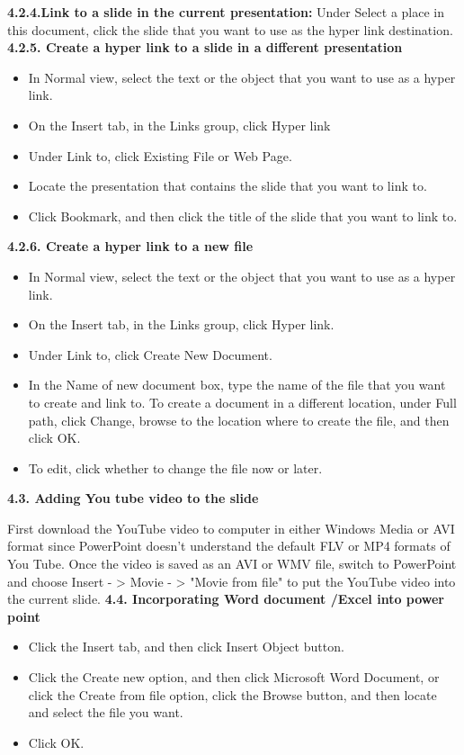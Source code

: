 \textbf{4.2.4.Link to a slide in the current presentation:}
Under Select a place in this document, click the slide that you want to use as the hyper link destination.
\textbf{4.2.5. Create a hyper link to a slide in a different presentation}
\begin{itemize}
  \item In Normal view, select the text or the object that you want to use as a hyper link.
  \item On the Insert tab, in the Links group, click Hyper link
  \item Under Link to, click Existing File or Web Page.
  \item  Locate the presentation that contains the slide that you want to link to.
  \item Click Bookmark, and then click the title of the slide that you want to link to.
\end{itemize}

\textbf{4.2.6. Create a hyper link to a new file} \cite {Anna willms web}
\begin{itemize}
  \item In Normal view, select the text or the object that you want to use as a hyper link.
  \item On the Insert tab, in the Links group, click Hyper link.
  \item Under Link to, click Create New Document.
  \item In the Name of new document box, type the name of the file that you want to create and link to.
To create a document in a different location, under Full path, click Change, browse to the location where to create the file, and then click OK.
  \item To edit, click whether to change the file now or later.
\end{itemize}


\textbf{4.3. Adding You tube video to the slide}

First download the YouTube video to computer in either Windows Media or AVI format since PowerPoint doesn't understand the default FLV or MP4 formats of You Tube. Once the video is saved as an AVI or WMV file, switch to PowerPoint and choose Insert - > Movie - > "Movie from file" to put the YouTube video into the current slide.
\textbf{4.4. Incorporating Word document /Excel into power point}
\begin{itemize}
  \item Click the Insert tab, and then click Insert Object button.
  \item  Click the Create new option, and then click Microsoft Word Document, or click the Create from file option, click the Browse button, and then 	locate and select the file you want.
  \item Click  OK.
\end{itemize}


